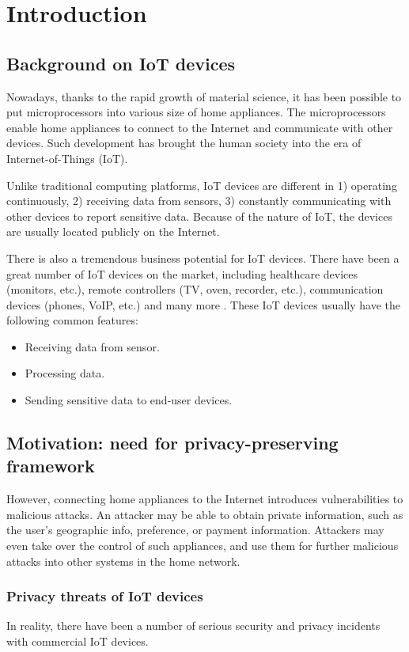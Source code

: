 \chapter{Introduction}

\section{Background on IoT devices}

Nowadays, thanks to the rapid growth of material science, it has been possible to put microprocessors into various size of home appliances. The microprocessors enable home appliances to connect to the Internet and communicate with other devices. Such development has brought the human society into the era of Internet-of-Things (IoT). 

Unlike traditional computing platforms, IoT devices are different in 1) operating continuously, 2) receiving data from sensors, 3) constantly communicating with other devices to report sensitive data. Because of the nature of IoT, the devices are usually located publicly on the Internet. 

There is also a tremendous business potential for IoT devices. There have been a great number of IoT devices on the market, including healthcare devices (monitors, etc.), remote controllers (TV, oven, recorder, etc.), communication devices (phones, VoIP, etc.) and many more \cite{hoang2015tor}. These IoT devices usually have the following common features:

\begin{itemize}
	\item Receiving data from sensor.
	\item Processing data.
	\item Sending sensitive data to end-user devices. 
\end{itemize}

\section{Motivation: need for privacy-preserving framework}
However, connecting home appliances to the Internet introduces vulnerabilities to malicious attacks. An attacker may be able to obtain private information, such as the user's geographic info, preference, or payment information. Attackers may even take over the control of such appliances, and use them for further malicious attacks into other systems in the home network. 

\subsection{Privacy threats of IoT devices}
In reality, there have been a number of serious security and privacy incidents with commercial IoT devices.

